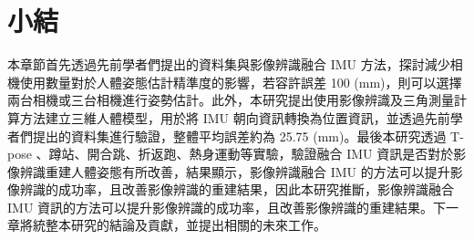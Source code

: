 
\section{小結}
本章節首先透過先前學者們提出的資料集與影像辨識融合 IMU 方法，探討減少相機使用數量對於人體姿態估計精準度的影響，若容許誤差 100 (mm)，則可以選擇兩台相機或三台相機進行姿勢估計。此外，本研究提出使用影像辨識及三角測量計算方法建立三維人體模型，用於將 IMU 朝向資訊轉換為位置資訊，並透過先前學者們提出的資料集進行驗證，整體平均誤差約為 25.75 (mm)。最後本研究透過 T-pose 、蹲站、開合跳、折返跑、熱身運動等實驗，驗證融合 IMU 資訊是否對於影像辨識重建人體姿態有所改善，結果顯示，影像辨識融合 IMU 的方法可以提升影像辨識的成功率，且改善影像辨識的重建結果，因此本研究推斷，影像辨識融合 IMU 資訊的方法可以提升影像辨識的成功率，且改善影像辨識的重建結果。下一章將統整本研究的結論及貢獻，並提出相關的未來工作。

\clearpage